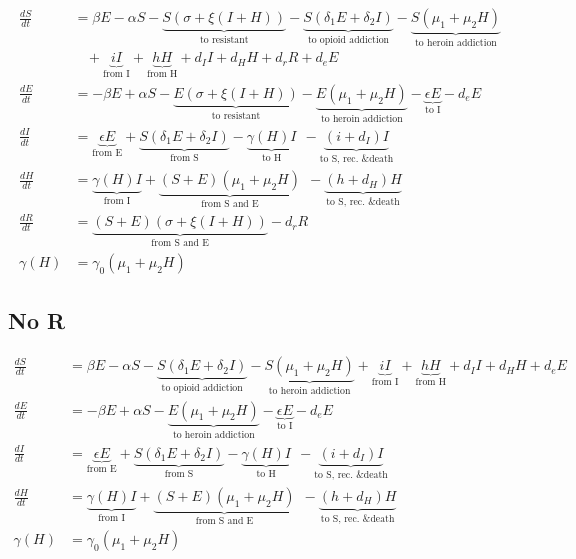 \documentclass[11pt]{report}
\begin{document}
\begin{align*}
\frac{dS}{dt} &= \beta E - \alpha S - \underbrace{S(\sigma + \xi(I+H))}_{\text{to resistant}} - \underbrace{S(\delta_1 E + \delta_2 I)}_{\text{to opioid addiction}} - \underbrace{S(\mu_1+\mu_2H)}_{\text{to heroin addiction}}\\
&\ \ \ \ + \underbrace{iI}_{\text{from I}} + \underbrace{hH}_{\text{from H}} 
+ d_I I + d_H H + d_r R + d_e E\\
\frac{dE}{dt} &= - \beta E + \alpha S - \underbrace{E(\sigma + \xi(I+H))}_{\text{to resistant}} - \underbrace{E(\mu_1 + \mu_2H)}_{\text{to heroin addiction}} - \underbrace{\epsilon E}_{\text{to I}} - d_e E\\
\frac{dI}{dt} &= \underbrace{\epsilon E}_{\text{from E}} + \underbrace{S(\delta_1E+\delta_2I)}_{\text{from S}} - \underbrace{\gamma(H)I}_{\text{to H}}\ \ 
- \underbrace{(i+d_I)I}_{\text{to S, rec. \& death}}\\
\frac{dH}{dt} &= \underbrace{\gamma(H)I}_{\text{from I}} + \underbrace{(S+E)(\mu_1+\mu_2H)}_{\text{from S and E}}\ \ - \underbrace{(h+d_H)H}_{\text{to S, rec. \& death}}\\
\frac{dR}{dt} &= \underbrace{(S+E)(\sigma + \xi(I+H))}_{\text{from S and E}} - d_rR\\
\gamma(H) &= \gamma_0(\mu_1+\mu_2H)
\end{align*}

\subsection*{No R}

\begin{align*}
\frac{dS}{dt} &= \beta E - \alpha S - \underbrace{S(\delta_1 E + \delta_2 I)}_{\text{to opioid addiction}} - \underbrace{S(\mu_1+\mu_2H)}_{\text{to heroin addiction}} 
+ \underbrace{iI}_{\text{from I}} + \underbrace{hH}_{\text{from H}} 
+ d_I I + d_H H + d_e E\\
\frac{dE}{dt} &= - \beta E + \alpha S - \underbrace{E(\mu_1 + \mu_2H)}_{\text{to heroin addiction}} - \underbrace{\epsilon E}_{\text{to I}} - d_e E\\
\frac{dI}{dt} &= \underbrace{\epsilon E}_{\text{from E}} + \underbrace{S(\delta_1E+\delta_2I)}_{\text{from S}} - \underbrace{\gamma(H)I}_{\text{to H}}\ \ 
- \underbrace{(i+d_I)I}_{\text{to S, rec. \& death}}\\
\frac{dH}{dt} &= \underbrace{\gamma(H)I}_{\text{from I}} + \underbrace{(S+E)(\mu_1+\mu_2H)}_{\text{from S and E}}\ \ - \underbrace{(h+d_H)H}_{\text{to S, rec. \& death}}\\
\gamma(H) &= \gamma_0(\mu_1+\mu_2H)
\end{align*}
\end{document}
